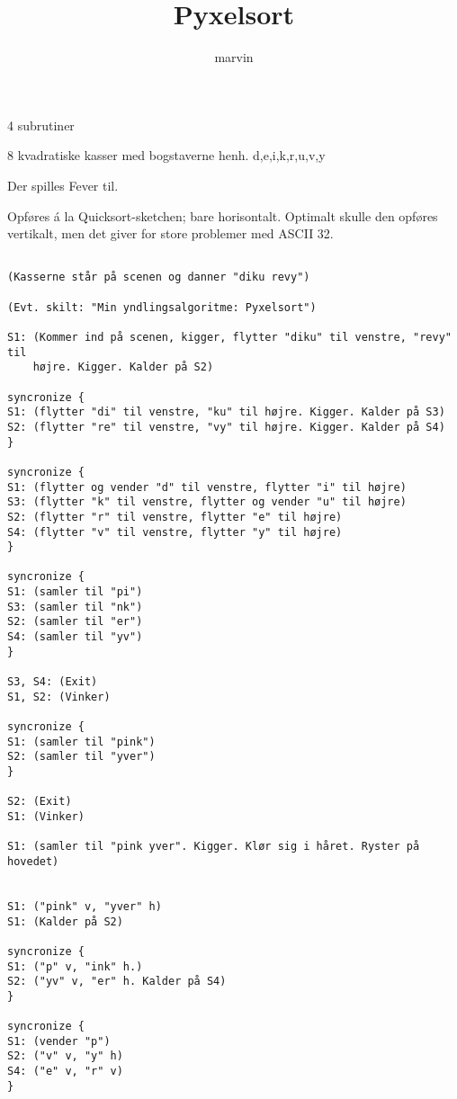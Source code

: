 \documentclass[danish]{article}
\title{Pyxelsort}
\author{marvin}
\begin{document}
\maketitle

\begin{roles}
   4 subrutiner
\end{roles}

\begin{props}
   8 kvadratiske kasser med bogstaverne henh. d,e,i,k,r,u,v,y
\end{props}

\begin{sketch}

\scene Der spilles Fever til.

\scene Opføres á la Quicksort-sketchen; bare horisontalt. Optimalt skulle den
opføres vertikalt, men det giver for store problemer med ASCII 32.

\begin{verbatim}

(Kasserne står på scenen og danner "diku revy")

(Evt. skilt: "Min yndlingsalgoritme: Pyxelsort")

S1: (Kommer ind på scenen, kigger, flytter "diku" til venstre, "revy" til
    højre. Kigger. Kalder på S2)

syncronize {
S1: (flytter "di" til venstre, "ku" til højre. Kigger. Kalder på S3)
S2: (flytter "re" til venstre, "vy" til højre. Kigger. Kalder på S4)
}

syncronize {
S1: (flytter og vender "d" til venstre, flytter "i" til højre)
S3: (flytter "k" til venstre, flytter og vender "u" til højre)
S2: (flytter "r" til venstre, flytter "e" til højre)
S4: (flytter "v" til venstre, flytter "y" til højre)
}

syncronize {
S1: (samler til "pi")
S3: (samler til "nk")
S2: (samler til "er")
S4: (samler til "yv")
}

S3, S4: (Exit)
S1, S2: (Vinker)

syncronize {
S1: (samler til "pink")
S2: (samler til "yver")
}

S2: (Exit)
S1: (Vinker)

S1: (samler til "pink yver". Kigger. Klør sig i håret. Ryster på hovedet)


S1: ("pink" v, "yver" h)
S1: (Kalder på S2)

syncronize {
S1: ("p" v, "ink" h.)
S2: ("yv" v, "er" h. Kalder på S4)
}

syncronize {
S1: (vender "p")
S2: ("v" v, "y" h)
S4: ("e" v, "r" v)
}


\end{verbatim}
\end{sketch}
\end{document}
